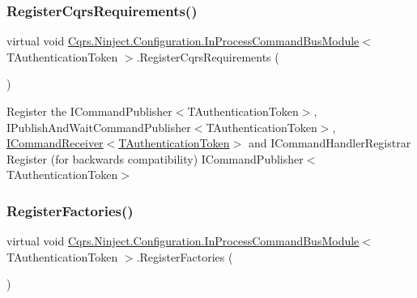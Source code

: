 \subsubsection{\texorpdfstring{Register\+Cqrs\+Requirements()}{RegisterCqrsRequirements()}}
{\footnotesize\ttfamily virtual void \hyperlink{classCqrs_1_1Ninject_1_1Configuration_1_1InProcessCommandBusModule}{Cqrs.\+Ninject.\+Configuration.\+In\+Process\+Command\+Bus\+Module}$<$ T\+Authentication\+Token $>$.Register\+Cqrs\+Requirements (\begin{DoxyParamCaption}{ }\end{DoxyParamCaption})\hspace{0.3cm}{\ttfamily [virtual]}}



Register the I\+Command\+Publisher$<$\+T\+Authentication\+Token$>$, I\+Publish\+And\+Wait\+Command\+Publisher$<$\+T\+Authentication\+Token$>$, \hyperlink{interfaceCqrs_1_1Commands_1_1ICommandReceiver}{I\+Command\+Receiver$<$\+T\+Authentication\+Token$>$} and I\+Command\+Handler\+Registrar Register (for backwards compatibility) I\+Command\+Publisher$<$\+T\+Authentication\+Token$>$ 

\mbox{\label{classCqrs_1_1Ninject_1_1Configuration_1_1InProcessCommandBusModule_a4591fb32f9ec60e3246a9864ab3288cd_a4591fb32f9ec60e3246a9864ab3288cd}} 
\subsubsection{\texorpdfstring{Register\+Factories()}{RegisterFactories()}}
{\footnotesize\ttfamily virtual void \hyperlink{classCqrs_1_1Ninject_1_1Configuration_1_1InProcessCommandBusModule}{Cqrs.\+Ninject.\+Configuration.\+In\+Process\+Command\+Bus\+Module}$<$ T\+Authentication\+Token $>$.Register\+Factories (\begin{DoxyParamCaption}{ }\end{DoxyParamCaption})\hspace{0.3cm}{\ttfamily [virtual]}}



